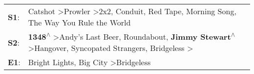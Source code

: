 \begin{supertabular}{p{0.03\textwidth}p{0.92\textwidth}}
 \textbf{S1}:  &                                                                                            Catshot\textsuperscript{} \textgreater \enspace Prowler\textsuperscript{} \textgreater \enspace 2x2\textsuperscript{}, \enspace Conduit\textsuperscript{}, \enspace Red Tape\textsuperscript{}, \enspace Morning Song\textsuperscript{}, \enspace The Way You Rule the World\textsuperscript{}  \enspace  \\
 \textbf{S2}:  &  \textbf{1348\textsuperscript{$\wedge$}} \textgreater \enspace Andy's Last Beer\textsuperscript{}, \enspace Roundabout\textsuperscript{}, \enspace \textbf{Jimmy Stewart\textsuperscript{$\wedge$}} \textgreater \enspace Hangover\textsuperscript{}, \enspace Syncopated Strangers\textsuperscript{}, \enspace Bridgeless\textsuperscript{} \textgreater {}\textsuperscript{}  \enspace  \\
 \textbf{E1}:  &                                                                                                                                                                                                                                                                                              Bright Lights, Big City\textsuperscript{} \textgreater \enspace Bridgeless\textsuperscript{}  \enspace  \\
\end{supertabular}
